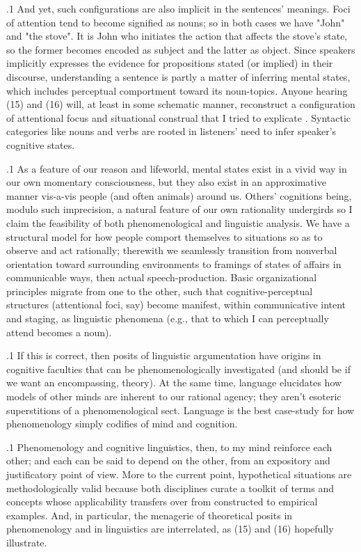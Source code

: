 \documentclass[11pt, twocolumn]{article}
\begin{document}
\p.1{%
And yet, such configurations are also implicit in the
sentences' meanings.  Foci of attention tend to become
signified as nouns; so in both cases we have "John" and
"the stove".  It is John who initiates the action that
affects the stove's state, so the former becomes encoded
as subject and the latter as object.  Since speakers
implicitly expresses the evidence for propositions
stated (or implied) in their discourse, understanding a
sentence is partly a matter of inferring mental states,
which includes perceptual comportment toward
its noun-topics.  Anyone hearing \exsRef(15) and \exsRef(16) will,
at least in some schematic manner, reconstruct a
configuration of attentional focus and situational
construal that I tried to explicate .
Syntactic categories like nouns and verbs are
rooted in listeners' need to infer speaker's cognitive states.
} %

\p.1{%
As a feature of our
reason and lifeworld, mental states exist
in a vivid way in our own momentary consciousness,
but they also exist in an approximative manner
vis-a-vis people (and often animals) around us.
Others' cognitions being, modulo such imprecision,
a natural feature of our own rationality undergirds
\mdash{} so I claim \mdash{} the feasibility of both
phenomenological and linguistic analysis.
We have a
structural model for how people comport themselves
to situations so as to observe and act rationally;
therewith we seamlessly transition
from nonverbal orientation toward surrounding
environments to framings of states of affairs
in communicable ways, then actual speech-production.
Basic organizational principles migrate from one to
the other, such that cognitive-perceptual structures
(attentional foci, say) become manifest,
within communicative intent and staging, as
linguistic phenomena (e.g., that to which
I can perceptually attend becomes a noun).
} %

\p.1{%
If this is correct, then posits of linguistic argumentation
have origins in cognitive faculties that can be
phenomenologically investigated (and should be if we
want an encompassing,  theory).  At the
same time, language elucidates
how models of other minds are inherent to our
rational agency; they aren't esoteric superstitions
of a phenomenological sect.  Language is the
best case-study for how phenomenology simply
codifies  of mind and cognition.
} %

\p.1{%
Phenomenology and cognitive linguistics, then, to
my mind reinforce each other; and each can be said
to depend on the other, from an expository
and justificatory point of view.  More to the current
point, hypothetical situations are methodologically
valid because both disciplines curate a
toolkit of terms and concepts whose
applicability transfers over from constructed
to empirical examples.  And, in particular, the
menagerie of theoretical posits in
phenomenology and in linguistics are interrelated,
as \exsRef(15) and \exsRef(16) hopefully illustrate.
} %
\end{document}

